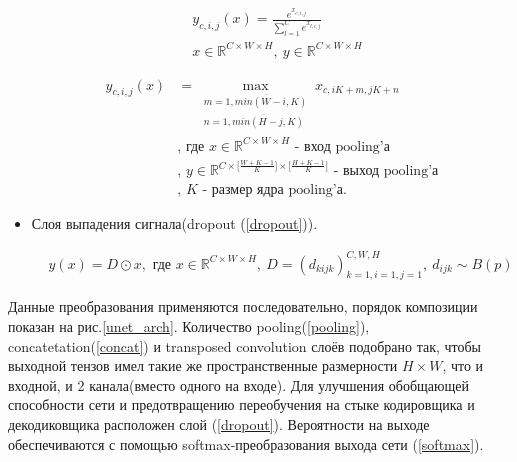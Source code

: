 \documentclass[12pt, a4paper]{extarticle}
\begin{document}
\begin{itemize}
\begin{equation} \label{softmax}
\begin{aligned}
	& y_{c, i, j}(x) = \frac{ e^{x_{c, i, j}} }
		{ \sum \limits_{l=1}^{C} e^{x_{l, i, j}} } \\
	& x \in \mathbb{R}^{C \times W \times H}
		,\ y \in \mathbb{R}^{C \times W \times H}
\end{aligned}
\end{equation}

\begin{equation} \label{pooling}
\begin{aligned}
	y_{c, i, j}(x) & = \max \limits_{
		\substack{
			m=\overline{1, min(W - i, K)}
			\\ n=\overline{1, min(H - j, K)}}}
		x_{c, i K + m, j K + n} \\
	& \text{, где $x \in \mathbb{R}^{C \times W \times H}$ 
		- вход pooling'а} \\
	& \text{, $y \in \mathbb{R}
		^{C 
		  \times \bigl[ \frac{W + K - 1}{K} \bigr] 
		  \times \bigl[ \frac{H + K - 1}{K} \bigr] }$ 
		- выход pooling'а} \\
	& \text{, $K$ - размер ядра pooling'а}.
\end{aligned}
\end{equation}

	\item Слоя выпадения сигнала(dropout (\ref{dropout})).

\begin{equation} \label{dropout}
\begin{aligned}
	&y(x) = D \odot x, \text{ где
		$x \in \mathbb{R}^{C \times W \times H},\ 
		D = (d_{kijk})_{k=1,i=1,j=1}^{C, W, H},\ d_{ijk} \sim B(p)$}
\end{aligned}
\end{equation}

\end{itemize}
	
Данные преобразования применяются последовательно, порядок композиции показан на рис.\ref{unet_arch}. 
Количество pooling(\ref{pooling}), concatetation(\ref{concat}) и
transposed convolution слоёв подобрано так, чтобы выходной тензов имел такие же пространственные размерности $H \times W$, что и входной, и 2 канала(вместо одного на входе). Для улучшения обобщающей способности сети и предотвращению переобучения на стыке кодировщика и декодиковщика расположен слой (\ref{dropout}). Вероятности на выходе обеспечиваются с помощью 
softmax-преобразования выхода сети (\ref{softmax}). 
\end{document}
